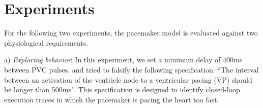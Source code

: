 \section{Experiments}
\label{experiments}


For the following two experiments, the pacemaker model is evaluated against two physiological requirements.

a) \emph{Exploring behavior}: In this experiment, we set a minimum delay of 400ms between PVC pulses, and tried to falsify the following specification:
``The interval between an activation of the ventricle node to a ventricular pacing (VP) should be longer than 500ms".
This specification is designed to identify closed-loop execution traces in which the pacemaker is pacing the heart too fast. %

